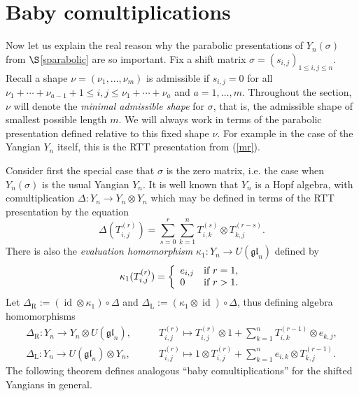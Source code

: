 \documentclass[twoside,12pt,reqno]{amsart}
\def\id{\operatorname{id}}
\def\rt{{\operatorname{\scriptscriptstyle R}}}
\def\lt{{\operatorname{\scriptscriptstyle L}}}
\begin{document}
\section{Baby comultiplications}\label{sbaby}

Now let us explain the real reason why the parabolic presentations
of $Y_n(\sigma)$ from $\S$\ref{sparabolic} are so important.
Fix a shift matrix $\sigma = (s_{i,j})_{1 \leq i,j \leq n}$.
Recall a shape $\nu = (\nu_1,\dots,\nu_m)$ is
{admissible} if
$s_{i,j} = 0$ for all $\nu_1+\cdots+\nu_{a-1}+1 
\leq i,j \leq \nu_1+\cdots+\nu_a$
and $a=1,\dots,m$.
Throughout the section, $\nu$
will denote the {\em minimal admissible shape} for $\sigma$,
that is, the admissible shape of smallest possible length $m$.
We will always work in terms of the parabolic
presentation defined relative to this fixed shape $\nu$.
For example in the case of the Yangian $Y_n$ itself, this is
the RTT presentation from (\ref{mr}).

Consider first the special case that $\sigma$ is the zero matrix,
i.e. the case when $Y_n(\sigma)$ is the usual Yangian $Y_n$. It
is well known that $Y_n$ is a Hopf algebra, with 
comultiplication $\Delta:Y_n \rightarrow Y_n \otimes Y_n$
which may be defined in terms of the RTT presentation
by the equation
\begin{equation}\label{comult}
\Delta(T_{i,j}^{(r)}) = \sum_{s=0}^r \sum_{k=1}^n
T_{i,k}^{(s)} \otimes T_{k,j}^{(r-s)}.
\end{equation}
There is also the 
{\em evaluation homomorphism}
$\kappa_1:Y_n \rightarrow U(\mathfrak{gl}_n)$
defined by 
\begin{equation}
\kappa_1(T_{i,j}^{(r)}) = 
\left\{
\begin{array}{ll}
e_{i,j}&\hbox{if $r = 1$,}\\
0&\hbox{if $r > 1$.}
\end{array}\right.
\end{equation}
Let $\Delta_{\rt} := (\id\otimes\kappa_1) \circ \Delta$
and $\Delta_{\lt} := (\kappa_1\otimes\id) \circ \Delta$, thus defining
algebra homomorphisms
\begin{align}
\Delta_{\rt}:Y_n \rightarrow Y_n\otimes U(\mathfrak{gl}_n),
\qquad
&T_{i,j}^{(r)} \mapsto T_{i,j}^{(r)} \otimes 1 + \sum_{k=1}^n 
T_{i,k}^{(r-1)} \otimes e_{k,j},
\label{babyr}\\
\Delta_{\lt}:Y_n \rightarrow U(\mathfrak{gl}_n) \otimes Y_n,
\qquad
&T_{i,j}^{(r)} \mapsto 1 \otimes T_{i,j}^{(r)} + \sum_{k=1}^n e_{i,k} \otimes 
T_{k,j}^{(r-1)}.
\label{babyl}
\end{align}
The following theorem 
defines analogous ``baby
comultiplications'' for the 
shifted Yangians in general.
\end{document}
